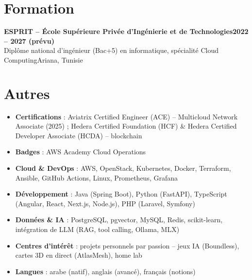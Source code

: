\documentclass[10pt]{article}
\newcommand{\entry}[4]{%
  \textbf{#1}\hfill\textbf{#2}\\
  #3\hfill #4\vspace{-1pt}}
\begin{document}
\section{Formation}

\entry{ESPRIT -- École Supérieure Privée d'Ingénierie et de Technologies}{2022 -- 2027 (prévu)}{Diplôme national d'ingénieur (Bac+5) en informatique, spécialité Cloud Computing}{Ariana, Tunisie}

\section{Autres}
\begin{itemize}
  \item \textbf{Certifications} : Aviatrix Certified Engineer (ACE) -- Multicloud Network Associate (2025) ; Hedera Certified Foundation (HCF) \& Hedera Certified Developer Associate (HCDA) -- blockchain
  \item \textbf{Badges} : AWS Academy Cloud Operations
  \item \textbf{Cloud \& DevOps} : AWS, OpenStack, Kubernetes, Docker, Terraform, Ansible, GitHub Actions, Linux, Prometheus, Grafana
  \item \textbf{Développement} : Java (Spring Boot), Python (FastAPI), TypeScript (Angular, React, Next.js, Node.js), PHP (Laravel, Symfony)
  \item \textbf{Données \& IA} : PostgreSQL, pgvector, MySQL, Redis, scikit-learn, intégration de LLM (RAG, tool calling, Ollama, MLX)
  \item \textbf{Centres d'intérêt} : projets personnels par passion -- jeux IA (Boundless), cartes 3D en direct (AtlasMesh), home lab
  \item \textbf{Langues} : arabe (natif), anglais (avancé), français (notions)
\end{itemize}
\end{document}
